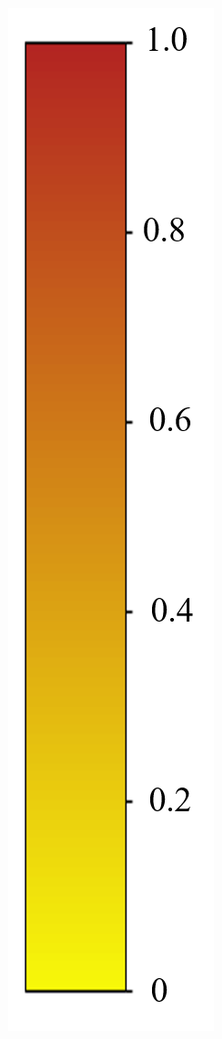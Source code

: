 \documentclass[letterpaper]{article}
\begin{document}
\begin{figure}[htbp]
\begin{center}
\begin{minipage}[b]{0.8\linewidth}
\begin{center}
\begin{minipage}[b]{0.12\linewidth}
\begin{center}
\end{center}
\end{minipage}
\end{center}
\end{minipage}
\begin{minipage}[b]{0.04\linewidth}
\begin{center}
\includegraphics[width=1.0\linewidth]{images/atten_pic/color_bar.png}

\end{center}
\end{minipage}
\end{center}
\end{figure}
\end{document}
